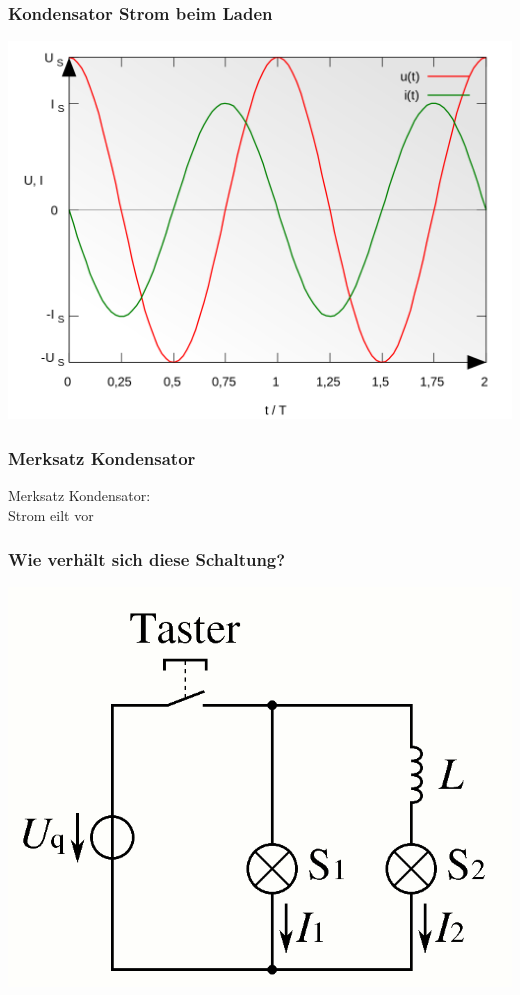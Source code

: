 \begin{frame}
    \frametitle{Kondensator Strom beim Laden}
	\begin{center}
        \includegraphics[width=1\textwidth,height=.85\textheight,keepaspectratio]{a03/Sinus_Voltage_and_Current_of_a_Capacitor.png}
        \tiny \hyperlink{refs}{\cite{wc}}
    \end{center}
\end{frame}

\begin{frame}
\frametitle{Merksatz Kondensator}
  \begin{block}{Merksatz}
    Kondensator:\\
    Strom eilt vor
  \end{block}
\end{frame}

\begin{frame}
    \frametitle{Wie verhält sich diese Schaltung?}
	\begin{center}
        \includegraphics[width=.8\textwidth,height=.85\textheight,keepaspectratio]{a03/Spulenstrom.png}
        \tiny \hyperlink{refs}{\cite{wc}}
    \end{center}
\end{frame}

